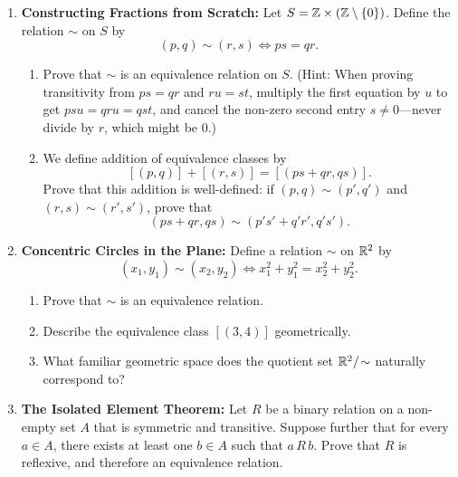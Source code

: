 \begin{enumerate}
\item \textbf{Constructing Fractions from Scratch:} Let $S = \mathbb{Z} \times (\mathbb{Z} \setminus \{0\})$. Define the relation $\sim$ on $S$ by
\[
(p, q) \sim (r, s) \iff ps = qr.
\]
\begin{enumerate}[label=(\alph*)]
\item Prove that $\sim$ is an equivalence relation on $S$. (Hint: When proving transitivity from $ps = qr$ and $ru = st$, multiply the first equation by $u$ to get $psu = qru = qst$, and cancel the non-zero second entry $s \neq 0$---never divide by $r$, which might be $0$.)
\item We define addition of equivalence classes by
\[
[(p, q)] + [(r, s)] = [(ps + qr, qs)].
\]
Prove that this addition is well-defined: if $(p, q) \sim (p', q')$ and $(r, s) \sim (r', s')$, prove that
\[
(ps + qr, qs) \sim (p's' + q'r', q's').
\]
\end{enumerate}

\item \textbf{Concentric Circles in the Plane:} Define a relation $\sim$ on $\mathbb{R}^2$ by
\[
(x_1, y_1) \sim (x_2, y_2) \iff x_1^2 + y_1^2 = x_2^2 + y_2^2.
\]
\begin{enumerate}[label=(\alph*)]
\item Prove that $\sim$ is an equivalence relation.
\item Describe the equivalence class $[(3, 4)]$ geometrically.
\item What familiar geometric space does the quotient set $\mathbb{R}^2 / \!\sim$ naturally correspond to?
\end{enumerate}

\item \textbf{The Isolated Element Theorem:} Let $R$ be a binary relation on a non-empty set $A$ that is symmetric and transitive. Suppose further that for every $a \in A$, there exists at least one $b \in A$ such that $a \, R \, b$. Prove that $R$ is reflexive, and therefore an equivalence relation.
\end{enumerate}

\newpage
